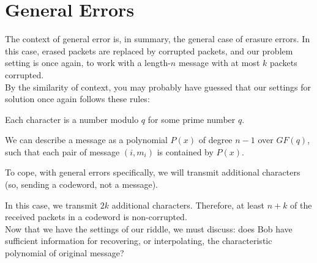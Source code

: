 \section{General Errors}
The context of general error is, in summary, the general case of erasure errors. In this case, erased packets are replaced by corrupted packets, and our problem setting is once again, to work with a length-$n$ message with at most $k$ packets corrupted. \\
By the similarity of context, you may probably have guessed that our settings for solution once again follows these rules:
\begin{bindenum}
    \item Each character is a number modulo $q$ for some prime number $q$.
    \item We can describe a message as a polynomial $P(x)$ of degree $n - 1$ over $GF(q)$, such that each pair of message $(i, m_i)$ is contained by $P(x)$.
    \item To cope, with general errors specifically, we will transmit additional characters (so, sending a codeword, not a message).
\end{bindenum}
In this case, we transmit $2k$ additional characters. Therefore, at least $n + k$ of the received packets in a codeword is non-corrupted. \\
Now that we have the settings of our riddle, we must discuss: does Bob have sufficient information for recovering, or interpolating, the characteristic polynomial of original message? \\

